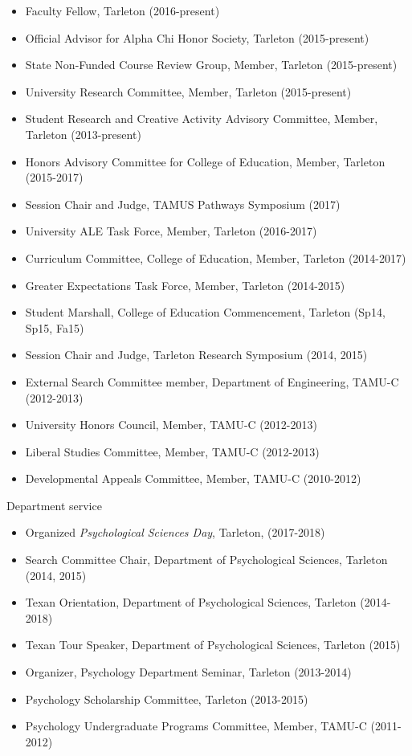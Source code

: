\documentclass[article,10pt]{article}
\begin{document}
\begin{itemize}
\item Faculty Fellow, Tarleton (2016-present)
\item Official Advisor for Alpha Chi Honor Society, Tarleton (2015-present)
\item State Non-Funded Course Review Group, Member, Tarleton (2015-present)
\item University Research Committee, Member, Tarleton (2015-present)
\item Student Research and Creative Activity Advisory Committee, Member, Tarleton (2013-present)
\item Honors Advisory Committee for College of Education, Member, Tarleton (2015-2017)
\item Session Chair and Judge, TAMUS Pathways Symposium (2017)
\item University ALE Task Force, Member, Tarleton (2016-2017)
\item Curriculum Committee, College of Education, Member, Tarleton (2014-2017)
\item Greater Expectations Task Force, Member, Tarleton (2014-2015)
\item Student Marshall, College of Education Commencement, Tarleton (Sp14, Sp15, Fa15)
\item Session Chair and Judge, Tarleton Research Symposium (2014, 2015)
\item External Search Committee member, Department of Engineering, TAMU-C (2012-2013)
\item University Honors Council, Member, TAMU-C (2012-2013)
\item Liberal Studies Committee, Member, TAMU-C (2012-2013)
\item Developmental Appeals Committee, Member, TAMU-C (2010-2012)
\end{itemize}

Department service

\begin{itemize}
\item Organized \emph{Psychological Sciences Day}, Tarleton, (2017-2018)
\item Search Committee Chair, Department of Psychological Sciences, Tarleton (2014, 2015)
\item Texan Orientation, Department of Psychological Sciences, Tarleton (2014-2018)
\item Texan Tour Speaker, Department of Psychological Sciences, Tarleton (2015)
\item Organizer, Psychology Department Seminar, Tarleton (2013-2014)
\item Psychology Scholarship Committee, Tarleton (2013-2015)
\item Psychology Undergraduate Programs Committee, Member, TAMU-C (2011-2012)
\end{itemize}
\end{document}
